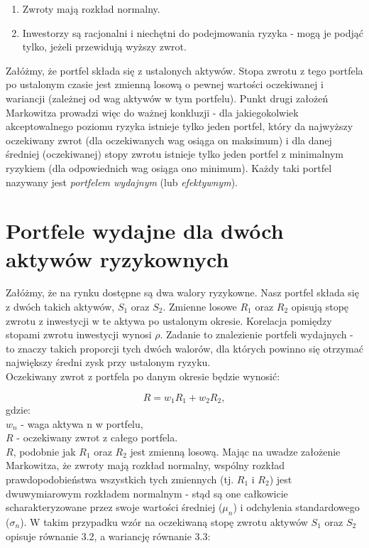 \documentclass[magister]{dyplom}
\begin{document}
\begin{enumerate}
	\item Zwroty mają rozkład normalny.
	\item Inwestorzy są racjonalni i niechętni do podejmowania ryzyka - mogą je podjąć tylko, jeżeli przewidują wyższy zwrot.
\end{enumerate}

Załóżmy, że portfel składa się z ustalonych aktywów. Stopa zwrotu z tego portfela po ustalonym czasie jest zmienną losową o pewnej wartości oczekiwanej i wariancji (zależnej od wag aktywów w tym portfelu).
Punkt drugi założeń Markowitza prowadzi więc do ważnej konkluzji - dla jakiegokolwiek akceptowalnego poziomu ryzyka istnieje tylko jeden portfel, który da najwyższy oczekiwany zwrot (dla oczekiwanych wag osiąga on maksimum) i dla danej średniej (oczekiwanej) stopy zwrotu istnieje tylko jeden portfel z minimalnym ryzykiem (dla odpowiednich wag osiąga ono minimum). Każdy taki portfel nazywany jest \textit{portfelem wydajnym} (lub \textit{efektywnym}).\par

\section{Portfele wydajne dla dwóch aktywów ryzykownych} 

Załóżmy, że na rynku dostępne są dwa walory ryzykowne. Nasz portfel składa się z dwóch takich aktywów, $S_1$ oraz $S_2$. Zmienne losowe $R_1$ oraz $R_2$ opisują stopę zwrotu z inwestycji w te aktywa po ustalonym okresie. Korelacja pomiędzy stopami zwrotu inwestycji wynosi $\rho$. Zadanie to znalezienie portfeli wydajnych - to znaczy takich proporcji tych dwóch walorów, dla których powinno się otrzymać największy średni zysk przy ustalonym ryzyku.\\
Oczekiwany zwrot z portfela po danym okresie będzie wynosić:

\begin{equation}
	R = w_1R_1 + w_2R_2,
\end{equation}
gdzie:\\
$w_n$ - waga aktywa n w portfelu,\\
$R$ - oczekiwany zwrot z całego portfela.\\
$R$, podobnie jak $R_1$ oraz $R_2$ jest zmienną losową. Mając na uwadze założenie Markowitza, że zwroty mają rozkład normalny, wspólny rozkład prawdopodobieństwa wszystkich tych zmiennych (tj. $R_1$ i $R_2$) jest dwuwymiarowym rozkładem normalnym - stąd są one całkowicie scharakteryzowane przez swoje wartości średniej ($\mu_n$) i odchylenia standardowego ($\sigma_n$). W takim przypadku wzór na oczekiwaną stopę zwrotu aktywów $S_1$ oraz $S_2$ opisuje równanie 3.2, a wariancję równanie 3.3:
\end{document}
